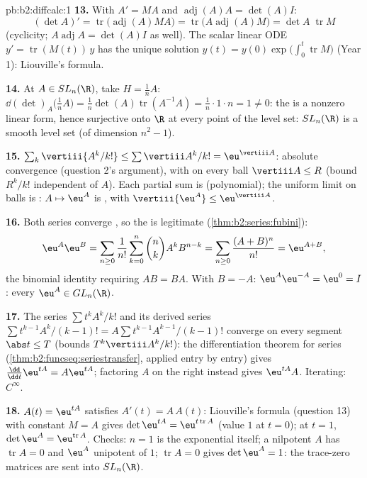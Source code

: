\begin{solution}{pb:b2:diffcalc:1}
\textbf{13.} With $A' = MA$ and
$\operatorname{adj}(A)A = \det(A)I$:
\[
(\det A)' = \operatorname{tr}\bigl(\operatorname{adj}(A)MA
\bigr)
= \operatorname{tr}\bigl(A\operatorname{adj}(A)M\bigr)
= \det A\;\operatorname{tr}M
\]
(cyclicity; $A\operatorname{adj}A = \det(A) I$ as well). The
scalar linear ODE $y' = \operatorname{tr}(M(t))\,y$ has the
unique solution $y(t) = y(0)\exp\bigl(\int_0^t
\operatorname{tr}M\bigr)$ (Year 1): Liouville's formula.

\textbf{14.} At $A \in SL_n(\R)$, take $H = \frac1nA$:
$\dd(\det)_A\bigl(\tfrac1nA\bigr) = \frac1n\det(A)
\operatorname{tr}(A^{-1}A) = \frac1n\cdot1\cdot n = 1 \neq 0$:
the  is a nonzero linear form, hence surjective
onto $\R$ at every point of the level set: $SL_n(\R)$ is a
smooth level set (of dimension $n^2 - 1$).

\textbf{15.} $\sum_k\vertiii{A^k/k!} \leq
\sum\vertiii A^k/k! = \eu^{\vertiii A}$: absolute convergence
(question 2's  argument), with 
on every ball $\vertiii A \leq R$ (bound $R^k/k!$ independent
of $A$). Each partial sum is  (polynomial); the
uniform limit on balls is : $A \mapsto \eu^A$ is
, with $\vertiii{\eu^A} \leq \eu^{\vertiii A}$.

\textbf{16.} Both series converge , so the  is legitimate (\cref{thm:b2:series:fubini}):
\[
\eu^A\eu^B = \sum_{n\geq0}\frac{1}{n!}\sum_{k=0}^n\binom
nkA^kB^{n-k}
= \sum_{n\geq0}\frac{(A+B)^n}{n!} = \eu^{A+B},
\]
the binomial identity requiring $AB = BA$. With $B = -A$:
$\eu^A\eu^{-A} = \eu^0 = I$: every $\eu^A \in GL_n(\R)$.

\textbf{17.} The series $\sum t^kA^k/k!$ and its derived series
$\sum t^{k-1}A^k/(k-1)! = A\sum t^{k-1}A^{k-1}/(k-1)!$ converge
 on every segment $\abs t \leq T$ (bounds
$T^k\vertiii A^k/k!$): the differentiation theorem for series
(\cref{thm:b2:funcseq:seriestransfer}, applied entry by entry)
gives $\frac{\dd}{\dd t}\eu^{tA} = A\eu^{tA}$; factoring $A$
on the right instead gives $\eu^{tA}A$. Iterating: $C^\infty$.

\textbf{18.} $A(t) = \eu^{tA}$ satisfies $A'(t) = A\,A(t)$:
Liouville's formula (question 13) with constant $M = A$ gives
$\det\eu^{tA} = \eu^{t\operatorname{tr}A}$ (value $1$ at $t =
0$); at $t = 1$, $\det\eu^A = \eu^{\operatorname{tr}A}$.
Checks: $n = 1$ is the exponential itself; a nilpotent $A$ has
$\operatorname{tr}A = 0$ and $\eu^A$ unipotent of 
$1$; $\operatorname{tr}A = 0$ gives $\det\eu^A = 1$: the
trace-zero matrices are sent into $SL_n(\R)$.


\end{solution}

